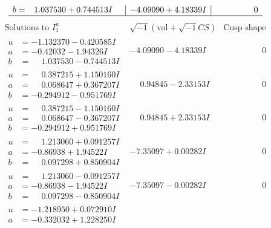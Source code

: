 \documentclass[1p]{elsarticle_modified}
\theoremstyle{definition}
\newcommand{\I}{\sqrt{-1}}
\begin{document}
$$\begin{array}{c|c|c}
\begin{aligned}
b &= \phantom{-}1.037530 + 0.744513 I\end{aligned}
 & -4.09090 + 4.18339 I & \phantom{-0.000000 } 0\\
 \hline 
 \end{array}$$\newpage$$\begin{array}{c|c|c}  
\text{Solutions to }I^u_{1}& \I (\text{vol} + \sqrt{-1}CS) & \text{Cusp shape}\\
 \hline 
\begin{aligned}
u &= -1.132370 - 0.420585 I \\
a &= -0.42032 - 1.94326 I \\
b &= \phantom{-}1.037530 - 0.744513 I\end{aligned}
 & -4.09090 - 4.18339 I & \phantom{-0.000000 } 0 \\ \hline\begin{aligned}
u &= \phantom{-}0.387215 + 1.150160 I \\
a &= \phantom{-}0.068647 + 0.367207 I \\
b &= -0.294912 - 0.951769 I\end{aligned}
 & \phantom{-}0.94845 - 2.33153 I & \phantom{-0.000000 } 0 \\ \hline\begin{aligned}
u &= \phantom{-}0.387215 - 1.150160 I \\
a &= \phantom{-}0.068647 - 0.367207 I \\
b &= -0.294912 + 0.951769 I\end{aligned}
 & \phantom{-}0.94845 + 2.33153 I & \phantom{-0.000000 } 0 \\ \hline\begin{aligned}
u &= \phantom{-}1.213060 + 0.091257 I \\
a &= -0.86938 + 1.94522 I \\
b &= \phantom{-}0.097298 + 0.850904 I\end{aligned}
 & -7.35097 + 0.00282 I & \phantom{-0.000000 } 0 \\ \hline\begin{aligned}
u &= \phantom{-}1.213060 - 0.091257 I \\
a &= -0.86938 - 1.94522 I \\
b &= \phantom{-}0.097298 - 0.850904 I\end{aligned}
 & -7.35097 - 0.00282 I & \phantom{-0.000000 } 0 \\ \hline\begin{aligned}
u &= -1.218950 + 0.072910 I \\
a &= -0.332032 + 1.228250 I \\

\end{aligned}
\end{array}$$
\end{document}
